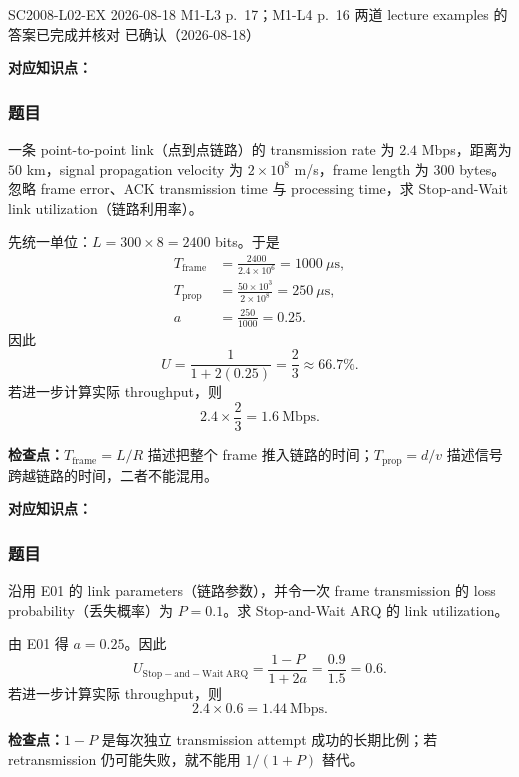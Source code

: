 

\examplemeta
  {SC2008-L02-EX}
  {2026-08-18}
  {M1-L3 p.~17；M1-L4 p.~16}
  {两道 lecture examples 的答案已完成并核对}
  {已确认（2026-08-18）}


\textbf{对应知识点：}

\subsubsection*{题目}

一条 point-to-point link（点到点链路）的 transmission rate 为 $2.4$ Mbps，距离为 $50$ km，signal propagation velocity 为 $2\times10^8$ m/s，frame length 为 $300$ bytes。忽略 frame error、ACK transmission time 与 processing time，求 Stop-and-Wait link utilization（链路利用率）。

\begin{workedsolution}
先统一单位：$L=300\times8=2400$ bits。于是
\begin{align*}
  T_{\mathrm{frame}}
    &=\frac{2400}{2.4\times10^6}
      =1000\ \mu\mathrm{s},\\
  T_{\mathrm{prop}}
    &=\frac{50\times10^3}{2\times10^8}
      =250\ \mu\mathrm{s},\\
  a&=\frac{250}{1000}=0.25.
\end{align*}
因此
\[
  U=\frac{1}{1+2(0.25)}=\frac{2}{3}\approx66.7\%.
\]
若进一步计算实际 throughput，则
\[
  2.4\times\frac{2}{3}=1.6\ \mathrm{Mbps}.
\]
\end{workedsolution}

\textbf{检查点：}$T_{\mathrm{frame}}=L/R$ 描述把整个 frame 推入链路的时间；$T_{\mathrm{prop}}=d/v$ 描述信号跨越链路的时间，二者不能混用。


\textbf{对应知识点：}

\subsubsection*{题目}

沿用 E01 的 link parameters（链路参数），并令一次 frame transmission 的 loss probability（丢失概率）为 $P=0.1$。求 Stop-and-Wait ARQ 的 link utilization。

\begin{workedsolution}
由 E01 得 $a=0.25$。因此
\[
  U_{\mathrm{Stop-and-Wait\ ARQ}}
  =\frac{1-P}{1+2a}
  =\frac{0.9}{1.5}
  =0.6.
\]
若进一步计算实际 throughput，则
\[
  2.4\times0.6=1.44\ \mathrm{Mbps}.
\]
\end{workedsolution}

\textbf{检查点：}$1-P$ 是每次独立 transmission attempt 成功的长期比例；若 retransmission 仍可能失败，就不能用 $1/(1+P)$ 替代。
